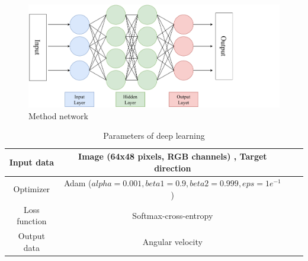 \begin{figure}[h]
    \centering
    \includegraphics[width = 13cm]{./figs/network.pdf}
    \caption{Method network}
    \label{fig::methodnetwork}
\end{figure}
\begin{table}[htb]
    \centering
    \caption{Parameters of deep learning}
    \begin{tabular}{|c|c|c|c|}
    \hline
    Input data    & Image (64x48 pixels, RGB channels) , Target direction                                             \\ \hline
    Optimizer     & Adam ($alpha = 0.001, beta1 = 0.9, beta2 = 0.999, eps = 1e^{-1}$ )  \\ \hline
    Loss function & Softmax-cross-entropy                                                            \\ \hline
    Output data   & Angular velocity                                              \\ \hline
    \end{tabular}
    \label{tb::param}
    \end{table}





